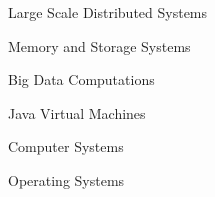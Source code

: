 
\begin{minipage}[t]{.33\linewidth}
  \begin{cvitems}
    \item Large Scale Distributed Systems
    \item Memory and Storage Systems
  \end{cvitems}
\end{minipage}%
%
\hspace{40pt}
%
\begin{minipage}[t]{.33\linewidth}
  \begin{cvitems}
    \item Big Data Computations
    \item Java Virtual Machines
  \end{cvitems}
\end{minipage}%
%
\hspace{35pt}
%
\begin{minipage}[t]{.33\linewidth}
  \begin{cvitems}
    \item Computer Systems
    \item Operating Systems
  \end{cvitems}
\end{minipage}

\vspace{15pt}
